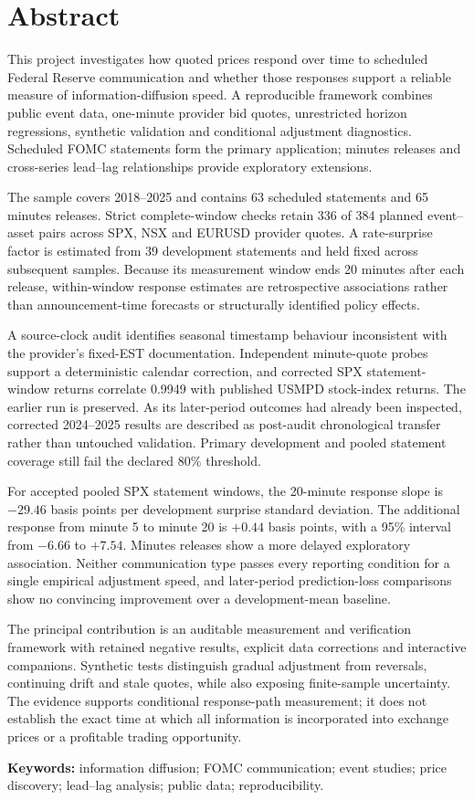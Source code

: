 \section*{Abstract}
This project investigates how quoted prices respond over time to scheduled Federal Reserve communication and whether those responses support a reliable measure of information-diffusion speed. A reproducible framework combines public event data, one-minute provider bid quotes, unrestricted horizon regressions, synthetic validation and conditional adjustment diagnostics. Scheduled FOMC statements form the primary application; minutes releases and cross-series lead--lag relationships provide exploratory extensions.

The sample covers 2018--2025 and contains 63 scheduled statements and 65 minutes releases. Strict complete-window checks retain 336 of 384 planned event--asset pairs across SPX, NSX and EURUSD provider quotes. A rate-surprise factor is estimated from 39 development statements and held fixed across subsequent samples. Because its measurement window ends 20 minutes after each release, within-window response estimates are retrospective associations rather than announcement-time forecasts or structurally identified policy effects.

A source-clock audit identifies seasonal timestamp behaviour inconsistent with the provider's fixed-EST documentation. Independent minute-quote probes support a deterministic calendar correction, and corrected SPX statement-window returns correlate 0.9949 with published USMPD stock-index returns. The earlier run is preserved. As its later-period outcomes had already been inspected, corrected 2024--2025 results are described as post-audit chronological transfer rather than untouched validation. Primary development and pooled statement coverage still fail the declared 80\% threshold.

For accepted pooled SPX statement windows, the 20-minute response slope is $-29.46$ basis points per development surprise standard deviation. The additional response from minute 5 to minute 20 is $+0.44$ basis points, with a 95\% interval from $-6.66$ to $+7.54$. Minutes releases show a more delayed exploratory association. Neither communication type passes every reporting condition for a single empirical adjustment speed, and later-period prediction-loss comparisons show no convincing improvement over a development-mean baseline.

The principal contribution is an auditable measurement and verification framework with retained negative results, explicit data corrections and interactive companions. Synthetic tests distinguish gradual adjustment from reversals, continuing drift and stale quotes, while also exposing finite-sample uncertainty. The evidence supports conditional response-path measurement; it does not establish the exact time at which all information is incorporated into exchange prices or a profitable trading opportunity.

\textbf{Keywords:} information diffusion; FOMC communication; event studies; price discovery; lead--lag analysis; public data; reproducibility.
